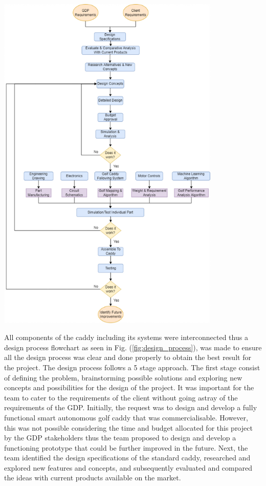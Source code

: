 \documentclass[11pt,landscape]{article}
\newenvironment{Figure}
  {\par\medskip\noindent\minipage{\linewidth}}
  {\endminipage\par\medskip}
\begin{document}
\begin{multicols}{2}
\begin{Figure} 
    \begin{center}
        \includegraphics[width=0.8\textwidth]{design_process.png}
    \end{center}
    \label{fig:design_process}
\end{Figure}


All components of the caddy including its systems were interconnected thus a
design process flowchart as seen in Fig. (\ref{fig:design_process}), was made to
ensure all the design process was clear and done properly to obtain the best
result for the project. The design process follows a 5 stage approach. The first
stage consist of defining the problem, brainstorming possible solutions and
exploring new concepts and possibilities for the design of the project. It was
important for the team to cater to the requirements of the client without going
astray of the requirements of the GDP. Initially, the request was to design and
develop a fully functional smart autonomous golf caddy that was
commercialisable. However, this was not possible considering the time and budget
allocated for this project by the GDP stakeholders thus the team proposed to
design and develop a functioning prototype that could be further improved in the
future. Next, the team identified the design specifications of the standard
caddy, researched and explored new features and concepts, and subsequently
evaluated and compared the ideas with current products available on the market. 



\end{multicols}
\end{document}
